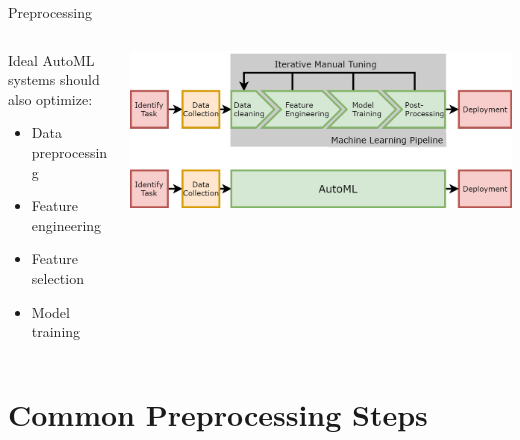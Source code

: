 \begin{frame}{Preprocessing}
  \begin{columns}
    \begin{column}{0.5\textwidth} 
      Ideal AutoML systems should also optimize: 
      \begin{itemize}
        \item[\ding{55}] Data preprocessing
        \item[\ding{55}] Feature engineering
        \item[\ding{55}] Feature selection
        \item[\ding{51}] Model training
      \end{itemize}
    \end{column}%
    \begin{column}{0.5\textwidth}
      \begin{center}
        \includegraphics[width = \linewidth]{images/AutoMLPipeline.jpg}  
      \end{center}
    \end{column}
  \end{columns}
  
\end{frame}

\section{Common Preprocessing Steps}

